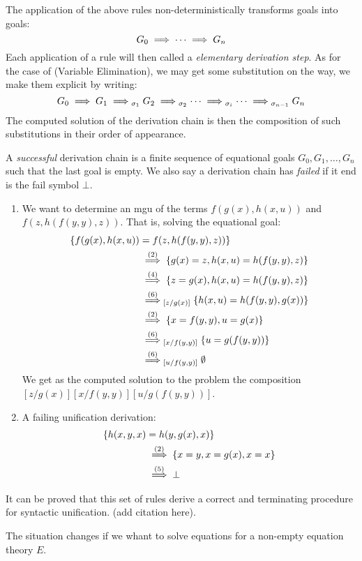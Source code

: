 The application of the above rules non-deterministically transforms goals into goals:
$$G_0 \mathrel{\implies} \cdots \mathrel{\implies} G_n$$
Each application of a rule will then called a \textit{elementary derivation step}. As for the case of (Variable Elimination), we may get some substitution on the way, we make them explicit by writing:
$$G_0 \mathrel{\implies} G_1 \mathrel{\implies}_{\sigma_1} G_2 \mathrel{\implies}_{\sigma_2} \cdots \mathrel{\implies}_{\sigma_i} \cdots \mathrel{\implies}_{\sigma_{n-1}} G_n$$
The computed solution of the derivation chain is then the composition of such substitutions in their order of appearance.

\begin{definition}
    A \textit{successful} derivation chain is a finite sequence of equational goals $G_0,G_1,\dots,G_n$ such that the last goal is empty. We also say a derivation chain has \textit{failed} if it end is the fail symbol $\bot$.
\end{definition}

\begin{example}
    \begin{enumerate}
        \item We want to determine an mgu of the terms $f(g(x),h(x,u))$ and $f(z,h(f(y,y),z))$. That is, solving the equational goal:
        \begin{align*}
            \{ f(g(x),h(x,u)) &= f(z,h(f(y,y),z)) \}\\
            &\overset{(2)}{\mathrel{\implies}} \{g(x) = z, h(x,u) = h(f(y,y),z)\} \\
            &\overset{(4)}{\mathrel{\implies}} \{z = g(x), h(x,u) = h(f(y,y),z)\} \\
            &\overset{(6)}{\mathrel{\implies}}_{[z/g(x)]} \{h(x,u) = h(f(y,y),g(x))\} \\
            &\overset{(2)}{\mathrel{\implies}} \{x = f(y,y), u = g(x) \} \\
            &\overset{(6)}{\mathrel{\implies}}_{[x/f(y,y)]} \{ u = g(f(y,y)) \} \\
            &\overset{(6)}{\mathrel{\implies}}_{[u/f(y,y)]} \emptyset
        \end{align*}
        We get as the computed solution to the problem the composition $[z/g(x)][x/f(y,y)][u/g(f(y,y))]$.

        \item A failing unification derivation:
        \begin{align*}
            \{ h(x,y,x) &= h(y,g(x),x)\}\\
            &\overset{(2)}{\mathrel{\implies}} \{x = y, x = g(x), x = x\} \\
            &\overset{(5)}{\mathrel{\implies}} \bot
        \end{align*}
    \end{enumerate}
\end{example}

It can be proved that this set of rules derive a correct and terminating procedure for syntactic unification. (add citation here).

The situation changes if we whant to solve equations for a non-empty equation theory $E$.

